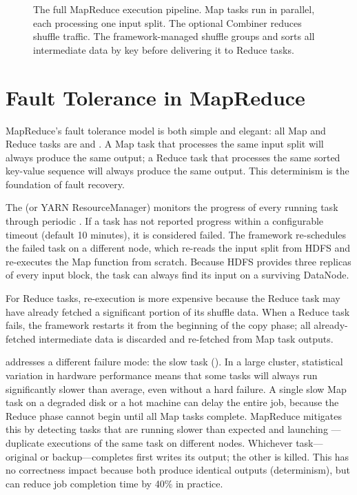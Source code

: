 \begin{figure}[h!t]
\caption{The full MapReduce execution pipeline. Map tasks run in
         parallel, each processing one input split. The optional
         Combiner reduces shuffle traffic. The framework-managed
         shuffle groups and sorts all intermediate data by key before
         delivering it to Reduce tasks.}
\label{fig:mr-pipeline}
\end{figure}

\section{Fault Tolerance in MapReduce}
\label{sec:mr-fault}

MapReduce's fault tolerance model is both simple and elegant: all
Map and Reduce tasks are  and .
A Map task that processes the same input split will always produce
the same output; a Reduce task that processes the same sorted key-value
sequence will always produce the same output. This determinism is the
foundation of fault recovery.

The  (or YARN ResourceManager) monitors the progress
of every running task through periodic . If a task
has not reported progress within a configurable timeout (default
10 minutes), it is considered failed. The framework re-schedules the
failed task on a different node, which re-reads the input split from
HDFS and re-executes the Map function from scratch. Because HDFS
provides three replicas of every input block, the task can always
find its input on a surviving DataNode.

For Reduce tasks, re-execution is more expensive because the Reduce
task may have already fetched a significant portion of its shuffle
data. When a Reduce task fails, the framework restarts it from the
beginning of the copy phase; all already-fetched intermediate data
is discarded and re-fetched from Map task outputs.

 addresses a different failure mode: the
slow task (). In a large cluster, statistical
variation in hardware performance means that some tasks will always
run significantly slower than average, even without a hard failure.
A single slow Map task on a degraded disk or a hot machine can
delay the entire job, because the Reduce phase cannot begin until
all Map tasks complete. MapReduce mitigates this by detecting tasks
that are running slower than expected and launching ---duplicate executions of the same task on different nodes.
Whichever task---original or backup---completes first writes its
output; the other is killed. This has no correctness impact because
both produce identical outputs (determinism), but can reduce job
completion time by 40\% in practice.

